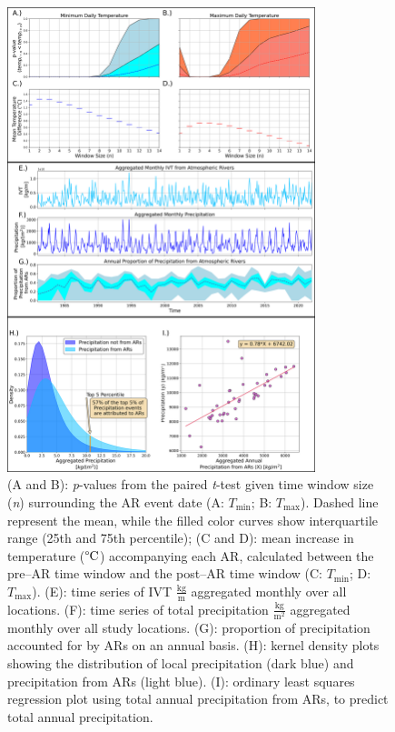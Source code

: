 \documentclass[12pts,draft]{AR_analysis_}
\begin{document}
\begin{figure}[H]
\centering
\includegraphics[width=0.8\textwidth]{./images/large.png}
\caption{(A and B): \emph{p}-values from the paired \emph{t}-test given
	time window size (\emph{n}) surrounding the AR event date (A:
	$T_{\text{min}}$; B: $T_{\text{max}}$). Dashed line represent the
		mean, while the filled color curves show interquartile range
		(25th and 75th percentile); 
	(C and D): mean increase in temperature ($\mathrm{\degree C}$) 
	accompanying each AR, calculated between the pre--AR 
	time window and the post--AR time window (C: $T_{\text{min}}$; D: $T_{\text{max}}$).
	(E): time series of IVT $\mathrm{\frac{kg}{m}}$ aggregated monthly 
	over all locations.
	(F): time series of total precipitation $\mathrm{\frac{kg}{m^{2}}}$ 
	aggregated monthly over all study locations. 
	(G): proportion of precipitation accounted for by
	ARs on an annual basis. 
	(H): kernel density plots showing the distribution of
	local precipitation (dark blue) and precipitation from ARs
	(light blue). 
	(I): ordinary least squares regression plot
	using total annual precipitation from ARs, to predict total annual
	precipitation.}
	
	
\label{fig:large} 
\end{figure}
\end{document}
